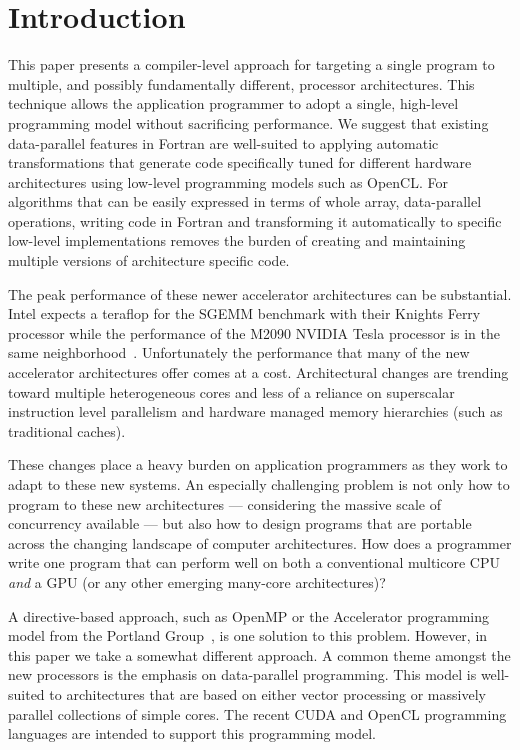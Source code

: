 \section{Introduction}
\label{sec:intro}

This paper presents a compiler-level approach for targeting a single program to
multiple, and possibly fundamentally different, processor architectures.  This
technique allows the application programmer to adopt a single, high-level
programming model without sacrificing performance.  We suggest that existing
data-parallel features in Fortran are well-suited to applying automatic
transformations that generate code specifically tuned for different hardware
architectures using low-level programming models such as OpenCL.  For algorithms
that can be easily expressed in terms of whole array, data-parallel operations,
writing code in Fortran and transforming it automatically to specific low-level
implementations removes the burden of creating and maintaining multiple versions
of architecture specific code.

The peak performance of these newer accelerator architectures can be substantial.
Intel expects a teraflop for the SGEMM benchmark with their Knights Ferry
processor while the performance of the M2090 NVIDIA Tesla processor is in the
same neighborhood~\citep{hpcwire11manycore}.  Unfortunately the performance that
many of the new accelerator architectures offer comes at a cost.  Architectural
changes are trending toward multiple heterogeneous cores and less of a reliance
on superscalar instruction level parallelism and hardware managed memory
hierarchies (such as traditional caches).  

These changes place a heavy burden on
application programmers as they work to adapt to these new systems.  An
especially challenging problem is not only how to program to these new
architectures --- considering the massive scale of concurrency available --- but
also how to design programs that are portable across the changing landscape of
computer architectures.  How does a programmer write one program that can
perform well on both a conventional multicore CPU \emph{and} a GPU (or any other emerging many-core architectures)?

A directive-based approach, such as OpenMP or the Accelerator programming model
from the Portland Group~\citep{pgi10accelerator}, is one solution to this
problem.  However, in this paper we take a somewhat different approach.  A
common theme amongst the new processors is the emphasis on data-parallel
programming.  This model is well-suited to architectures that are
based on either vector processing or massively parallel collections of simple
cores.  The recent CUDA and OpenCL programming languages are intended to
support this programming model.

